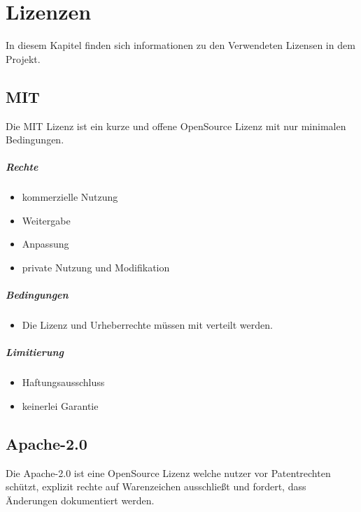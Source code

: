 \chapter{Lizenzen}

In diesem Kapitel finden sich informationen zu den Verwendeten Lizensen in dem Projekt.

\section{MIT}\label{sec:mit}
Die MIT Lizenz ist ein kurze und offene OpenSource Lizenz mit nur minimalen Bedingungen.

\paragraph{Rechte}
\begin{itemize}
    \item kommerzielle Nutzung
    \item Weitergabe
    \item Anpassung
    \item private Nutzung und Modifikation
\end{itemize}

\paragraph{Bedingungen}
\begin{itemize}
    \item Die Lizenz und Urheberrechte müssen mit verteilt werden.
\end{itemize}

\paragraph{Limitierung}
\begin{itemize}
    \item Haftungsausschluss
    \item keinerlei Garantie
\end{itemize}

\section{Apache-2.0}\label{sec:apache-2.0}

Die Apache-2.0 ist eine OpenSource Lizenz welche nutzer vor Patentrechten schützt,
explizit rechte auf Warenzeichen ausschließt und fordert, dass Änderungen dokumentiert werden.

